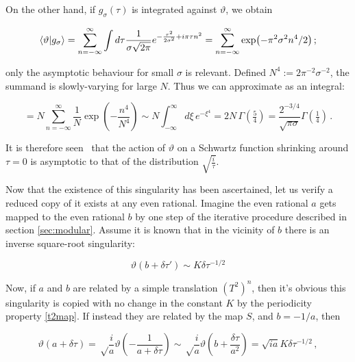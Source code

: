 \documentclass{article}
\newcommand{\intR}{\int_{-\infty}^\infty}
\newcommand{\sumZ}{\sum_{n=-\infty}^{\infty}}
\begin{document}
On the other hand, if $g_\sigma(\tau)$ is integrated against $\vartheta$, we obtain

\begin{equation}
    \bra{\vartheta}\ket{g_\sigma} = \sumZ \int d\tau \frac{1}{\sigma \sqrt{2\pi}} e^{-\frac{\tau^2}{2\sigma^2} + i\pi\tau n^2}  = \sumZ \exp(-\pi^2 \sigma^2 n^4 / 2)\,; 
\end{equation}

only the asymptotic behaviour for small $\sigma$ is relevant. Defined $N^4 := 2 \pi^{-2} \sigma^{-2}$, the summand is slowly-varying for large $N$. Thus we can approximate as an integral:

\begin{equation}
    = N \sumZ \frac{1}{N} \exp(-\frac{n^4}{N^4}) \sim N \intR d\xi \, e^{-\xi^4} = 2 N \, \Gamma(\tfrac{5}{4}) = \frac{2^{-3/4}}{\sqrt{\pi\sigma}} \Gamma(\tfrac{1}{4})\,.
\end{equation}

It is therefore seen%
\ that the action of $\vartheta$ on a Schwartz function shrinking around $\tau=0$ is asymptotic to that of the distribution $\sqrt{\frac{i}{\tau}}$.

Now that the existence of this singularity has been ascertained, let us verify a reduced copy of it exists at any even rational. Imagine the even rational $a$ gets mapped to the even rational $b$ by one step of the iterative procedure described in section \ref{sec:modular}. Assume it is known that in the vicinity of $b$ there is an inverse square-root singularity:

\begin{equation}
    \vartheta(b + \delta\tau') \sim K \delta \tau^{-1/2}
\end{equation}

Now, if $a$ and $b$ are related by a simple translation $(T^2)^n$, then it's obvious this singularity is copied with no change in the constant $K$ by the periodicity property \eqref{t2map}. If instead they are related by the map $S$, and $b = -1/a$, then

\begin{equation}
    \vartheta(a + \delta\tau) = \sqrt\frac{i}{a} \vartheta\left(-\frac{1}{a+\delta\tau}\right) \sim \sqrt\frac{i}{a} \vartheta(b + \frac{\delta \tau}{a^2}) = \sqrt{ia} K \delta\tau^{-1/2}\,,
\end{equation}
\end{document}

